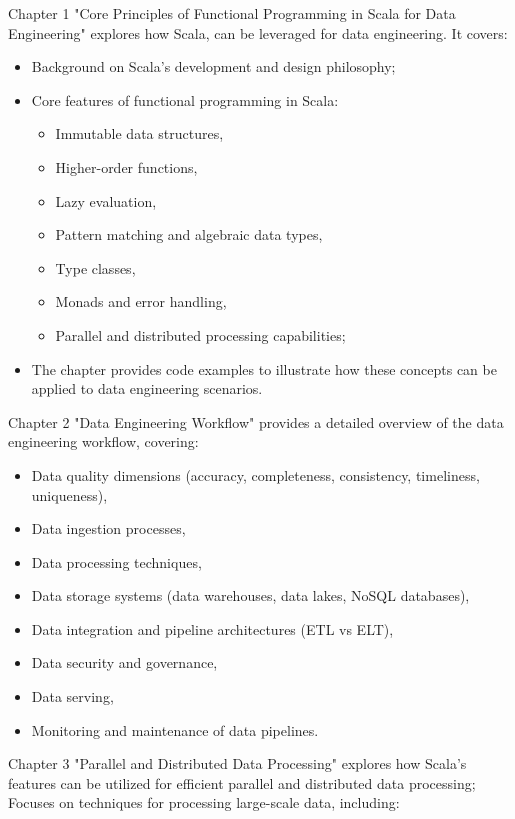 Chapter 1 "Core Principles of Functional Programming in Scala for Data Engineering" explores how Scala, can be leveraged for data engineering. It covers:

\begin{itemize}
    \item Background on Scala's development and design philosophy;
    \item Core features of functional programming in Scala:
\begin{itemize}
    \item Immutable data structures,
    \item Higher-order functions,
    \item Lazy evaluation,
    \item Pattern matching and algebraic data types,
    \item Type classes,
    \item Monads and error handling,
    \item Parallel and distributed processing capabilities;
\end{itemize}
\item The chapter provides code examples to illustrate how these concepts can be applied to data engineering scenarios.

\end{itemize}

Chapter 2 "Data Engineering Workflow" provides a detailed overview of the data engineering workflow, covering:

\begin{itemize}
    \item Data quality dimensions (accuracy, completeness, consistency, timeliness, uniqueness),
    \item Data ingestion processes,
    \item Data processing techniques,
    \item Data storage systems (data warehouses, data lakes, NoSQL databases),
    \item Data integration and pipeline architectures (ETL vs ELT),
    \item Data security and governance,
    \item Data serving,
    \item Monitoring and maintenance of data pipelines.
\end{itemize}

Chapter 3 "Parallel and Distributed Data Processing" explores how Scala's features can be utilized for efficient parallel and distributed data processing; Focuses on techniques for processing large-scale data, including:


